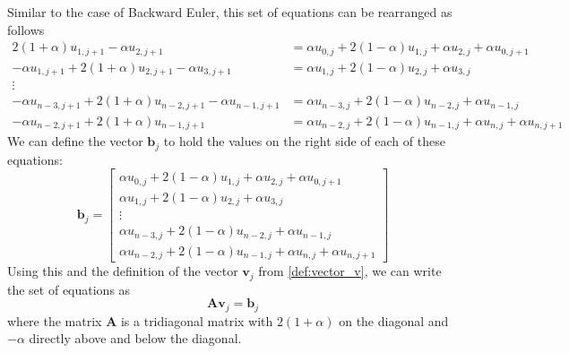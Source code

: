 \documentclass[reprint, english,notitlepage,nofootinbib]{revtex4-1}  %
\newcommand{\vc}[1]{\mathbf{#1}}
\begin{document}
Similar to the case of Backward Euler, this set of equations can be rearranged as follows
\begin{align*}
  2 (1 + \alpha) u_{1, j+1} - \alpha u_{2, j+1}
    &= \alpha u_{0, j}  + 2 (1 - \alpha) u_{1,j} + \alpha u_{2, j} + \alpha u_{0, j+1} \\
  - \alpha u_{1, j+1} + 2 (1 + \alpha) u_{2, j+1} - \alpha u_{3, j+1}
    &= \alpha u_{1, j}  + 2 (1 - \alpha) u_{2,j} + \alpha u_{3, j} \\
    \vdots \\
  - \alpha u_{n-3, j+1} + 2 (1 + \alpha) u_{n-2, j+1} - \alpha u_{n-1, j+1}
    &= \alpha u_{n-3, j}  + 2 (1 - \alpha) u_{n-2,j} + \alpha u_{n-1, j} \\
  - \alpha u_{n-2, j+1} + 2 (1 + \alpha) u_{n-1, j+1}
    &= \alpha u_{n-2, j}  + 2 (1 - \alpha) u_{n-1,j} + \alpha u_{n, j} + \alpha u_{n, j+1}
\end{align*}
We can define the vector $\vc b_j$ to hold the values on the right side of each of these equations:
\begin{equation}
  \label{def:vector_b_CrankNicolson_appendix}
  \vc b_j =
  \begin{bmatrix}
    \alpha u_{0, j}  + 2 (1 - \alpha) u_{1,j} + \alpha u_{2, j} + \alpha u_{0, j+1} \\
    \alpha u_{1, j}  + 2 (1 - \alpha) u_{2,j} + \alpha u_{3, j} \\
      \vdots \\
    \alpha u_{n-3, j}  + 2 (1 - \alpha) u_{n-2,j} + \alpha u_{n-1, j} \\
    \alpha u_{n-2, j}  + 2 (1 - \alpha) u_{n-1,j} + \alpha u_{n, j} + \alpha u_{n, j+1}
  \end{bmatrix}
\end{equation}
Using this and the definition of the vector $\vc v_j$ from \eqref{def:vector_v}, we can write the set of equations as
\begin{equation*}
  \vc A \vc v_j = \vc b_j
\end{equation*}
where the matrix $\vc A$ is a tridiagonal matrix with $2 (1 + \alpha)$ on the diagonal and $-\alpha$ directly above and below the diagonal.
\end{document}
